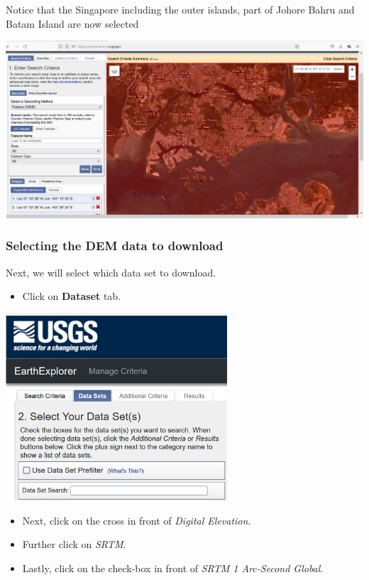 \documentclass[
  letterpaper,
  DIV=11,
  numbers=noendperiod]{scrreprt}
\providecommand{\tightlist}{%
  \setlength{\itemsep}{0pt}\setlength{\parskip}{0pt}}\usepackage{longtable,booktabs,array}
\begin{document}
Notice that the Singapore including the outer islands, part of Johore
Bahru and Batam Island are now selected

\includegraphics{./img06/image26.jpg}

\hypertarget{selecting-the-dem-data-to-download}{%
\subsubsection{Selecting the DEM data to
download}\label{selecting-the-dem-data-to-download}}

Next, we will select which data set to download.

\begin{itemize}
\tightlist
\item
  Click on \textbf{Dataset} tab.
\end{itemize}

\includegraphics[width=3.25in,height=\textheight]{./img06/image27.jpg}

\begin{itemize}
\item
  Next, click on the cross in front of \emph{Digital Elevation}.
\item
  Further click on \emph{SRTM}.
\item
  Lastly, click on the check-box in front of \emph{SRTM 1 Arc-Second
  Global}.
\end{itemize}
\end{document}
